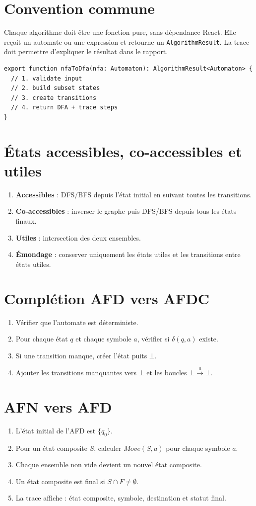 \documentclass[11pt,a4paper]{report}
\newcommand{\code}[1]{\texttt{#1}}
\begin{document}
\section{Convention commune}
Chaque algorithme doit être une fonction pure, sans dépendance React. Elle reçoit un automate ou une expression et retourne un \code{AlgorithmResult}. La trace doit permettre d'expliquer le résultat dans le rapport.

\begin{lstlisting}
export function nfaToDfa(nfa: Automaton): AlgorithmResult<Automaton> {
  // 1. validate input
  // 2. build subset states
  // 3. create transitions
  // 4. return DFA + trace steps
}
\end{lstlisting}

\section{États accessibles, co-accessibles et utiles}
\begin{enumerate}
  \item \textbf{Accessibles} : DFS/BFS depuis l'état initial en suivant toutes les transitions.
  \item \textbf{Co-accessibles} : inverser le graphe puis DFS/BFS depuis tous les états finaux.
  \item \textbf{Utiles} : intersection des deux ensembles.
  \item \textbf{Émondage} : conserver uniquement les états utiles et les transitions entre états utiles.
\end{enumerate}

\section{Complétion AFD vers AFDC}
\begin{enumerate}
  \item Vérifier que l'automate est déterministe.
  \item Pour chaque état $q$ et chaque symbole $a$, vérifier si $\delta(q,a)$ existe.
  \item Si une transition manque, créer l'état puits $\bot$.
  \item Ajouter les transitions manquantes vers $\bot$ et les boucles $\bot \xrightarrow{a} \bot$.
\end{enumerate}

\section{AFN vers AFD}
\begin{enumerate}
  \item L'état initial de l'AFD est $\{q_0\}$.
  \item Pour un état composite $S$, calculer $Move(S,a)$ pour chaque symbole $a$.
  \item Chaque ensemble non vide devient un nouvel état composite.
  \item Un état composite est final si $S \cap F \neq \emptyset$.
  \item La trace affiche : état composite, symbole, destination et statut final.
\end{enumerate}
\end{document}
